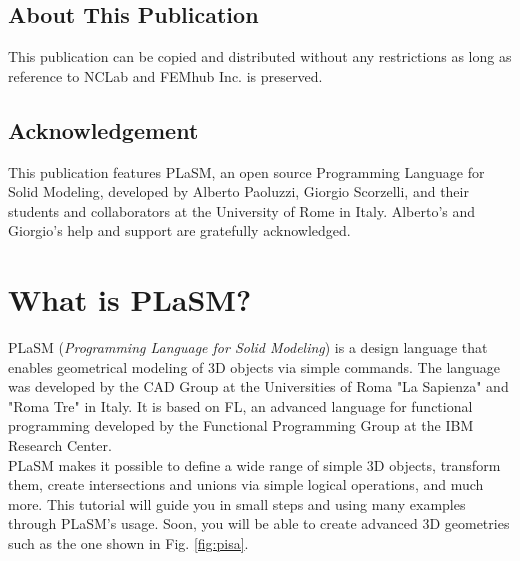 \documentclass[article,A4,12pt]{llncs}
\begin{document}
\subsection*{About This Publication}
This publication can be copied and distributed without any restrictions
as long as reference to NCLab and FEMhub Inc. is preserved.

\subsection*{Acknowledgement}
This publication features PLaSM, an open source Programming Language for 
Solid Modeling, developed by Alberto Paoluzzi, Giorgio Scorzelli, and their 
students and collaborators at the University of Rome in Italy. Alberto's 
and Giorgio's help and support are gratefully acknowledged. 

\normalsize

\newpage
\setcounter{tocdepth}{2}
\tableofcontents

\newpage

\pagestyle{plain}
\setcounter{page}{1}


\section{What is PLaSM?}

PLaSM ({\em Programming Language for Solid Modeling}) is a design language
that enables geometrical modeling of 3D objects via simple commands.
The language was developed by the CAD Group at the Universities of Roma 
"La Sapienza" and "Roma Tre" in Italy. It is based on FL, an advanced 
language for functional programming developed by the Functional 
Programming Group at the IBM Research Center.\\

\noindent
PLaSM makes it possible to define a wide range of simple 3D objects, transform 
them, create intersections and unions via simple logical operations, and much 
more. This tutorial will guide you in small steps and using many examples
through PLaSM's usage. Soon, you will be able to create advanced 
3D geometries such as the one shown in Fig. \ref{fig:pisa}.
\end{document}
